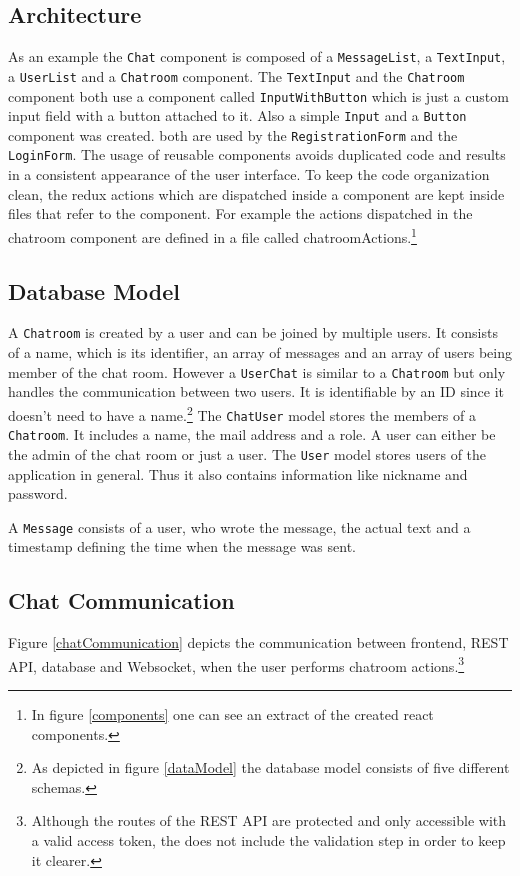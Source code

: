 \subsection{Architecture}
As an example the \texttt{Chat} component is composed of a \texttt{MessageList}, a \texttt{TextInput}, a \texttt{UserList} and a \texttt{Chatroom} component.
The \texttt{TextInput} and the \texttt{Chatroom} component both use a component called \texttt{InputWithButton} which is just a custom input field with a button attached to it. Also a simple \texttt{Input} and a \texttt{Button} component was created. both are used by the \texttt{RegistrationForm} and the \texttt{LoginForm}.
The usage of reusable components avoids duplicated code and results in a consistent appearance of the user interface.
To keep the code organization clean, the redux actions which are dispatched inside a component are kept inside files that refer to the component. For example the actions dispatched in the chatroom component are defined in a file called chatroomActions.\footnote{In figure \ref{components} one can see an extract of the  created react components.}

\subsection{Database Model}
A \texttt{Chatroom} is created by a user and can be joined by multiple users. It consists of a name, which is its identifier, an array of messages and an array of users being member of the chat room. 
However a \texttt{UserChat} is similar to a \texttt{Chatroom} but only handles the communication between two users. It is identifiable by an ID since it doesn’t need to have a name.\footnote{As depicted in figure \ref{dataModel} the database model consists of five different schemas.}
The  \texttt{ChatUser} model stores the members of a  \texttt{Chatroom}. It includes a name, the mail address and a role. A user can either be the admin of the chat room or just a user.
The  \texttt{User} model stores users of the application in general. Thus it also contains information like nickname and password.

A  \texttt{Message} consists of a user, who wrote the message, the actual text and a timestamp defining the time when the message was sent.

\subsection{Chat Communication}
Figure \ref{chatCommunication} depicts the communication between frontend, REST API, database and Websocket, when the user performs chatroom actions.\footnote{Although the routes of the REST API are protected and only accessible with a valid access token, the  does not include the validation step in order to keep it clearer.}

